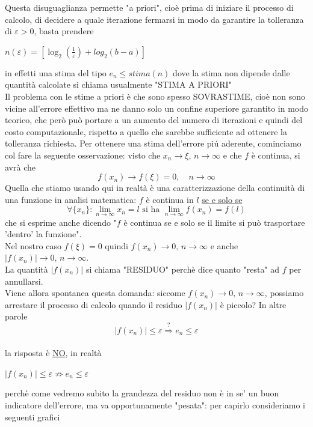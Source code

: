 \documentclass[12pt]{article}
\begin{document}
Questa disuguaglianza permette "a priori", cioè prima di iniziare il processo di calcolo, di decidere a quale iterazione fermarsi in modo da garantire la tolleranza di $\varepsilon > 0$, basta prendere 
\begin{center} %
    $n(\varepsilon) = [\log_2(\frac{1}{\varepsilon}) + log_2{(b-a)}]$
\end{center}
in effetti una stima del tipo $e_n \leq stima(n)$ dove la stima non dipende dalle quantità calcolate si chiama usualmente "STIMA A PRIORI"
\\Il problema con le stime a priori è che sono spesso SOVRASTIME, cioè non sono vicine all'errore effettivo ma ne danno solo un confine superiore garantito in modo teorico, che però può portare a un aumento del numero di iterazioni e quindi del costo computazionale, rispetto a quello che sarebbe sufficiente ad ottenere la tolleranza richiesta.
Per ottenere una stima dell'errore piú aderente, cominciamo col fare la seguente osservazione: visto che $x_n \to \xi,\,n\to \infty$ e che $f$ è continua, si avrà che \[f(x_n) \to f(\xi)=0,\quad n \to \infty\]
Quella che stiamo usando qui in realtà è una caratterizzazione della continuità di una funzione in analisi matematica: $f$ è continua in $l$ \underline{se e solo se}
\[\forall \{x_n\}:\lim_{n\to \infty}x_n=l \text{ si ha } \lim_{n\to \infty}f(x_n)=f(l)\]
che si esprime anche dicendo "$f$ è continua se e solo se il limite si può trasportare 'dentro' la funzione".\\
Nel nostro caso $f(\xi)=0$ quindi $f(x_n) \to 0,\,n \to \infty$ e anche $|f(x_n)|\to 0,\,n \to \infty$.\\
La quantità $|f(x_n)|$ si chiama "RESIDUO" perchè dice quanto "resta" ad $f$ per annullarsi.\\
Viene allora spontanea questa domanda: siccome $f(x_n) \to 0,\,n \to \infty$, possiamo arrestare il processo di calcolo quando il residuo $|f(x_n)|$ è piccolo? In altre parole
\[|f(x_n)|\le \varepsilon \overset{?}{\Longrightarrow} e_n \le \varepsilon\]
\\la risposta è \underline{NO}, in realtà\\
\begin{center}
$\left| f(x_n)\right|\le \varepsilon \nRightarrow e_n\le \varepsilon$
\end{center}
perchè come vedremo subito la grandezza del residuo non è in se' un buon indicatore dell'errore, ma va opportunamente "pesata": per capirlo consideriamo i seguenti grafici\\
\end{document}
